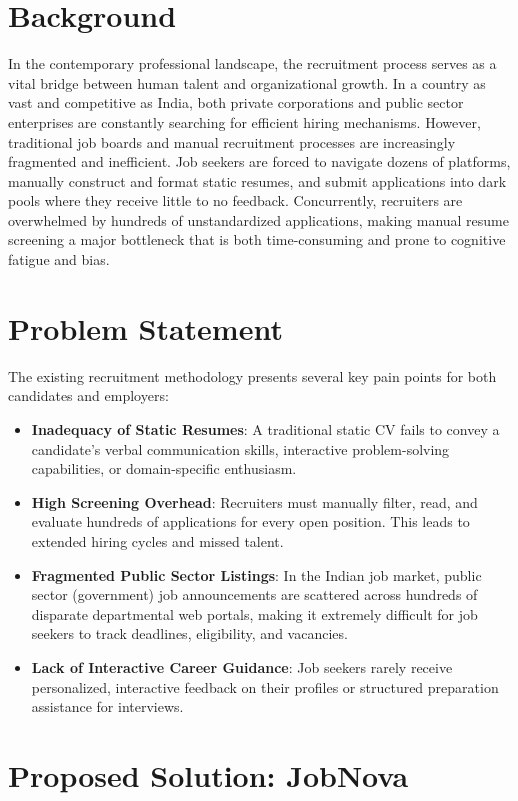 \documentclass[12pt,a4paper]{report}
\begin{document}
\section{Background}

In the contemporary professional landscape, the recruitment process serves as a vital bridge between human talent and organizational growth. In a country as vast and competitive as India, both private corporations and public sector enterprises are constantly searching for efficient hiring mechanisms. However, traditional job boards and manual recruitment processes are increasingly fragmented and inefficient. Job seekers are forced to navigate dozens of platforms, manually construct and format static resumes, and submit applications into dark pools where they receive little to no feedback. Concurrently, recruiters are overwhelmed by hundreds of unstandardized applications, making manual resume screening a major bottleneck that is both time-consuming and prone to cognitive fatigue and bias.

\section{Problem Statement}

The existing recruitment methodology presents several key pain points for both candidates and employers:
\begin{itemize}
    \item \textbf{Inadequacy of Static Resumes}: A traditional static CV fails to convey a candidate's verbal communication skills, interactive problem-solving capabilities, or domain-specific enthusiasm.
    \item \textbf{High Screening Overhead}: Recruiters must manually filter, read, and evaluate hundreds of applications for every open position. This leads to extended hiring cycles and missed talent.
    \item \textbf{Fragmented Public Sector Listings}: In the Indian job market, public sector (government) job announcements are scattered across hundreds of disparate departmental web portals, making it extremely difficult for job seekers to track deadlines, eligibility, and vacancies.
    \item \textbf{Lack of Interactive Career Guidance}: Job seekers rarely receive personalized, interactive feedback on their profiles or structured preparation assistance for interviews.
\end{itemize}

\section{Proposed Solution: JobNova}
\end{document}
